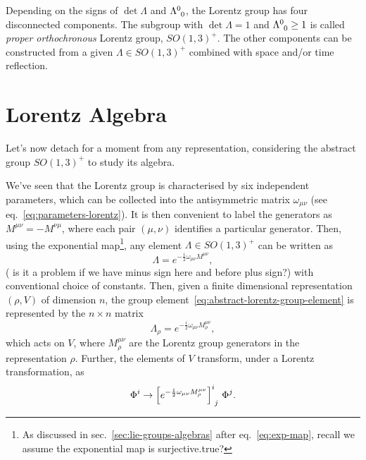 Depending on the signs of $\det \Lambda$ and $\tensor{\Lambda}{^0_0}$, the Lorentz group has four disconnected components. The subgroup with $\det \Lambda = 1$ and $\tensor{\Lambda}{^0_0} \geq 1$ is called \emph{proper orthochronous} Lorentz group, $SO(1,3)^+$. The other components can be constructed from a given $\Lambda \in SO(1,3)^+$ combined with space and/or time reflection.


\section{Lorentz Algebra}\label{sec:lorentz-algebra}
Let's now detach for a moment from any representation, considering the abstract group $SO(1,3)^+$ to study its algebra.

We've seen that the Lorentz group is characterised by six independent parameters, which can be collected into the antisymmetric matrix $\omega_{\mu\nu}$ (see eq.~\eqref{eq:parameters-lorentz}). It is then convenient to label the generators as $M^{\mu\nu} = -M^{\nu\mu}$, where each pair $(\mu,\nu)$ identifies a particular generator. Then, using the exponential map\footnote{As discussed in sec.~\ref{sec:lie-groups-algebras} after eq.~\eqref{eq:exp-map}, recall we assume the exponential map is surjective.\color{red}true?\color{black}}, any element $\Lambda \in SO(1,3)^+$ can be written as
\begin{equation}\label{eq:abstract-lorentz-group-element}
   \Lambda = e^{-\frac{i}{2} \omega_{\mu\nu} M^{\mu\nu}},
\end{equation}
(\color{red} is it a problem if we have minus sign here and before plus sign?\color{black}) with conventional choice of constants. Then, given a finite dimensional representation $(\rho, V)$ of dimension $n$, the group element~\eqref{eq:abstract-lorentz-group-element} is represented by the $n \times n$ matrix
\begin{equation}
    \Lambda_\rho = e^{-\frac{i}{2} \omega_{\mu\nu} M^{\mu\nu}_\rho},
\end{equation}
which acts on $V$, where $M^{\mu\nu}_\rho$ are the Lorentz group generators in the representation $\rho$. Further, the elements of $V$ transform, under a Lorentz transformation, as
\begin{equation}
    \Phi^i \to \tensor{\left[ e^{-\frac{i}{2} \omega_{\mu\nu} M^{\mu\nu}_\rho} \right]}{^i_j}  \, \Phi^j .
\end{equation}


